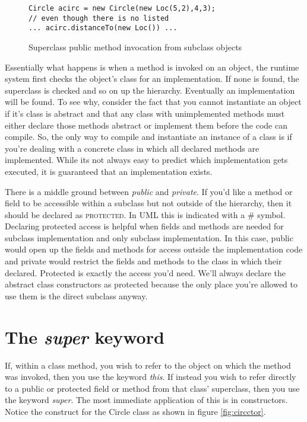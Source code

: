 \documentclass[]{tufte-handout}
\begin{document}
\begin{figure}[!ht]
\begin{lstlisting}
Circle acirc = new Circle(new Loc(5,2),4,3);
// even though there is no listed 
... acirc.distanceTo(new Loc()) ...
\end{lstlisting}
\label{fig:supercall}
\caption{Superclass public method invocation from subclass objects}
\end{figure}

Essentially what happens is when a method is invoked on an object, the runtime system first checks the object's class for an implementation. If none is found, the superclass is checked and so on up the hierarchy. Eventually an implementation will be found. To see why, consider the fact that you cannot instantiate an object if it's class is abstract and that any class with unimplemented methods must either declare those methods abstract or implement them before the code can compile. So, the only way to compile and instantiate an instance of a class is if you're dealing with a concrete class in which all declared methods are implemented. While its not always easy to predict which implementation gets executed, it is guaranteed that an implementation exists. 

There is a middle ground between \textit{public} and \textit{private}. If you'd like a method or field to be accessible within a subclass but not outside of the hierarchy, then it should be declared as \textsc{protected}. In UML this is indicated with a \# symbol. Declaring protected access is helpful when fields and methods are needed for subclass implementation and only subclass implementation. In this case, public would open up the fields and methods for access outside the implementation code and private would restrict the fields and methods to the class in which their declared. Protected is exactly the access you'd need. We'll always declare the abstract class constructors as protected because the only place you're allowed to use them is the direct subclass anyway. 

\section{The \textit{super} keyword}

If, within a class method, you wish to refer to the object on which the method was invoked, then you use the keyword \textit{this}. If instead you wish to refer directly to a public or protected field or method from that class' superclass, then you use the keyword \textit{super}.  The most immediate application of this is in constructors. Notice the construct for the Circle class as shown in figure \ref{fig:circctor}.
\end{document}
